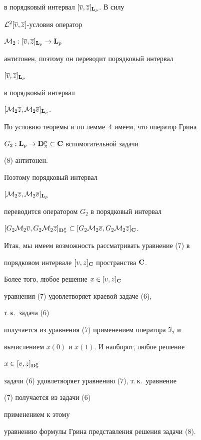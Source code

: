 \begin{pf}
в порядковый интервал $[\overline {v},\overline {z}]_{\bold L_p}$. В силу


${\cal L}^2[\overline {v},\overline {z}]$-условия оператор


${\cal M}_2:[\overline {v},\overline {z}]_{\bold L_p}\to\bold L_p$


антитонен, поэтому он переводит порядковый интервал


$[\overline {v},\overline {z}]_{\bold L_p}$


в порядковый интервал


$[{\cal M}_2\overline {z},{\cal M}_2\overline {v}]_{\bold L_p}$.


По условию теоремы и по лемме~4 имеем, что оператор Грина


$G_2:\bold L_p\to\bold D_\pi^p\subset\bold C$ вспомогательной задачи


(8) антитонен.


Поэтому порядковый интервал


$[{\cal M}_2\overline {z},{\cal M}_2\overline {v}]_{\bold L_p}$


переводится оператором $G_2$ в порядковый интервал


$[G_2{\cal M}_2\overline {v},G_2{\cal M}_2\overline {z}]_{\bold D_\pi^p}


\subset[G_2{\cal M}_2\overline {v},G_2{\cal M}_2\overline {z}]_{\bold C}$.





Итак, мы имеем возможность рассматривать уравнение (7) в


порядковом интервале $[v,z]_{\bold C}$ пространства $\bold C$.


Более того, любое решение $x\in[v,z]_{\bold C}$


уравнения (7) удовлетворяет краевой задаче (6),


т.\,к.~задача (6)


получается из уравнения (7) применением оператора ${\Im}_2$ и


вычислением $x(0)$ и $x(1)$. И наоборот, любое решение


$x\in[v,z]_{\bold D_\pi^p}$


задачи (6) удовлетворяет уравнению (7), т.\,к.~уравнение


(7) получается из задачи (6)


применением к этому


уравнению формулы Грина представления решения задачи (8).






\end{pf}
